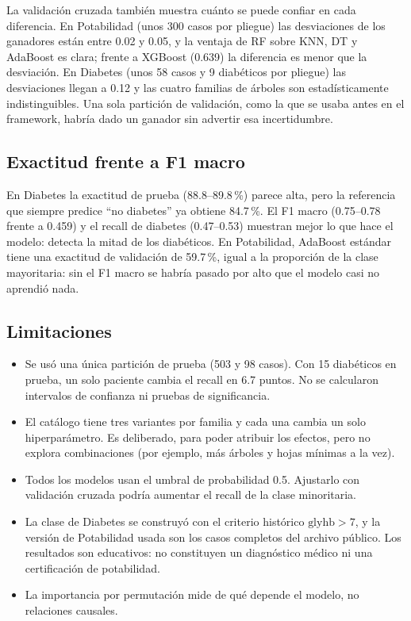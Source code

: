 \documentclass[11pt]{article}
\begin{document}
La validación cruzada también muestra cuánto se puede confiar en cada diferencia. En
Potabilidad (unos 300 casos por pliegue) las desviaciones de los ganadores están entre
0.02 y 0.05, y la ventaja de RF sobre KNN, DT y AdaBoost es clara; frente a XGBoost
(0.639) la diferencia es menor que la desviación. En Diabetes (unos 58 casos y 9
diabéticos por pliegue) las desviaciones llegan a 0.12 y las cuatro familias de árboles
son estadísticamente indistinguibles. Una sola partición de validación, como la que se
usaba antes en el framework, habría dado un ganador sin advertir esa incertidumbre.

\subsection{Exactitud frente a F1 macro}
En Diabetes la exactitud de prueba (88.8--89.8\,\%) parece alta, pero la referencia que
siempre predice ``no diabetes'' ya obtiene 84.7\,\%. El F1 macro (0.75--0.78 frente a
0.459) y el recall de diabetes (0.47--0.53) muestran mejor lo que hace el modelo: detecta
la mitad de los diabéticos. En Potabilidad, AdaBoost estándar tiene una exactitud de
validación de 59.7\,\%, igual a la proporción de la clase mayoritaria: sin el F1 macro
se habría pasado por alto que el modelo casi no aprendió nada.

\subsection{Limitaciones}
\begin{itemize}
\item Se usó una única partición de prueba (503 y 98 casos). Con 15 diabéticos en
prueba, un solo paciente cambia el recall en 6.7 puntos. No se calcularon intervalos de
confianza ni pruebas de significancia.
\item El catálogo tiene tres variantes por familia y cada una cambia un solo
hiperparámetro. Es deliberado, para poder atribuir los efectos, pero no explora
combinaciones (por ejemplo, más árboles y hojas mínimas a la vez).
\item Todos los modelos usan el umbral de probabilidad 0.5. Ajustarlo con validación
cruzada podría aumentar el recall de la clase minoritaria.
\item La clase de Diabetes se construyó con el criterio histórico $\text{glyhb}>7$, y la
versión de Potabilidad usada son los casos completos del archivo público. Los resultados
son educativos: no constituyen un diagnóstico médico ni una certificación de potabilidad.
\item La importancia por permutación mide de qué depende el modelo, no relaciones
causales.
\end{itemize}
\end{document}
